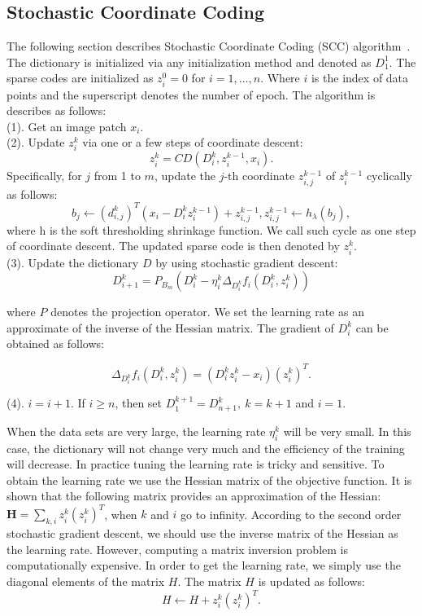 \documentclass[authoryear,preprint,revi	ew,12pt]{elsarticle}
\begin{document}
\appendix
\subsection{\textbf{Stochastic Coordinate Coding}}
\label{app:SCC}
The following section describes Stochastic Coordinate Coding (SCC) algorithm~\citep{lin2014stochastic}. The dictionary is initialized via any initialization method and denoted as $ D_1^1 $. The sparse codes are initialized as $ z_i^0 = 0 $ for $ i=1,\dots,n $. Where $ i $ is the index of data points and the superscript denotes the number of epoch. The algorithm is describes as follows:\\
(1). Get an image patch $ x_i $.\\
(2). Update $ z_i^k $ via one or a few steps of coordinate descent: 
\begin{equation}
z^k_i = CD(D^k_i,z^{k-1}_i,x_i).
\end{equation}
Specifically, for $ j $ from 1 to $ m $, update the $ j $-th coordinate $ z_{i,j}^{k-1} $ of $ z_{i}^{k-1} $ cyclically as follows:
\begin{equation}
b_j \gets (d_{i,j}^k)^T (x_i - D_i^kz^{k-1}_i) + z^{k-1}_{i,j}, z_{i,j}^{k-1} \gets h_{\lambda}(b_j),
\end{equation}	
where h is the soft thresholding shrinkage function. We call such cycle as one step of coordinate descent. The updated sparse code is then denoted by $ z_i^k $. \\
(3). Update the dictionary $ D $ by using stochastic gradient descent:
\begin{equation}
D_{i+1}^k = P_{B_m}(D_i^k - \eta^k_i\Delta_{D_i^k} f_i(D_i^k,z^k_i))
\end{equation}

where $ P $ denotes the projection operator. We set the learning rate as an approximate of the inverse of the Hessian matrix. The gradient of $ D_i^k $ can be obtained as follows:

\begin{equation}
\Delta_{D_i^k} f_i (D_i^k, z_i^k) = (D^k_iz^k_i - x_i)(z^k_i)^T.
\end{equation}

(4). $ i = i+1 $. If $ i \ge n $, then set $ D_1^{k+1} = D^k_{n+1}, ~k=k+1$ and $ i = 1 $.

When the data sets are very large, the learning rate $ \eta^k_i $ will be very small. In this case, the dictionary will not change very much and the efficiency of the training will decrease. In practice tuning the learning rate is tricky and sensitive. To obtain the learning rate we use the Hessian matrix of the objective function. It is shown that the following matrix provides an approximation of the Hessian: $ \mathbf{H} = \sum_{k,i} z^k_i(z^k_i)^T $, when $ k $ and $ i $ go to infinity. According to the second order stochastic gradient descent, we should use the inverse matrix of the Hessian as the learning rate. However, computing a matrix inversion problem is computationally expensive. In order to get the learning rate, we simply use the diagonal elements of the matrix $ H $. The matrix $ H $ is updated as follows:
\begin{equation}
	H \gets H + z^k_i(z^k_i)^T.
\end{equation}
\end{document}
